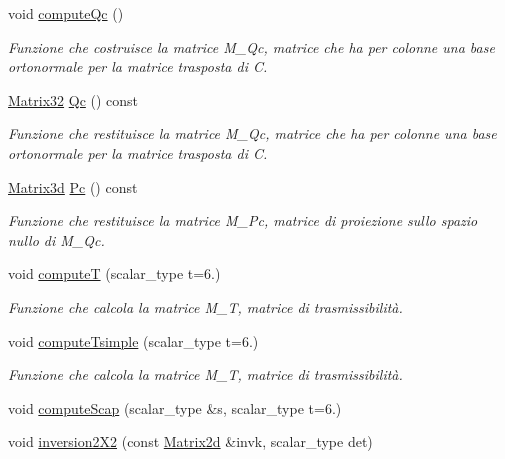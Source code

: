 \begin{DoxyCompactItemize}
void \hyperlink{classMatrixBifurcationHandler_a203b6bfcdef418ffa927aebaeedc6da2}{compute\-Qc} ()
\begin{DoxyCompactList}\small\item\em Funzione che costruisce la matrice M\-\_\-\-Qc, matrice che ha per colonne una base ortonormale per la matrice trasposta di C. \end{DoxyCompactList}\item 
\hyperlink{Core_8h_aee82131e398edee47a44d675ee802368}{Matrix32} \hyperlink{classMatrixBifurcationHandler_add50b813d3bd773ddf794c4e05b37e38}{Qc} () const 
\begin{DoxyCompactList}\small\item\em Funzione che restituisce la matrice M\-\_\-\-Qc, matrice che ha per colonne una base ortonormale per la matrice trasposta di C. \end{DoxyCompactList}\item 
\hyperlink{Core_8h_acd816705c6602062b91975525c4e3f6f}{Matrix3d} \hyperlink{classMatrixBifurcationHandler_ad84675e9be6d56de69c0e25bf1cd77cd}{Pc} () const 
\begin{DoxyCompactList}\small\item\em Funzione che restituisce la matrice M\-\_\-\-Pc, matrice di proiezione sullo spazio nullo di M\-\_\-\-Qc. \end{DoxyCompactList}\item 
void \hyperlink{classMatrixBifurcationHandler_a46ee3c60eedda32abe36700ab2ce2d16}{compute\-T} (scalar\-\_\-type t=6.)
\begin{DoxyCompactList}\small\item\em Funzione che calcola la matrice M\-\_\-\-T, matrice di trasmissibilità. \end{DoxyCompactList}\item 
void \hyperlink{classMatrixBifurcationHandler_a2153adb36bdbba82ca18ae74eb9e2ea7}{compute\-Tsimple} (scalar\-\_\-type t=6.)
\begin{DoxyCompactList}\small\item\em Funzione che calcola la matrice M\-\_\-\-T, matrice di trasmissibilità. \end{DoxyCompactList}\item 
void \hyperlink{classMatrixBifurcationHandler_aed78abe5cb83c5e6b0b2f9f1538f51ac}{compute\-Scap} (scalar\-\_\-type \&s, scalar\-\_\-type t=6.)
\item 
void \hyperlink{classMatrixBifurcationHandler_acafb7a17c3d639068938a21dad6bb0ec}{inversion2\-X2} (const \hyperlink{Core_8h_a1694976dd66ed00e5f0618f4f8821163}{Matrix2d} \&invk, scalar\-\_\-type det)

\end{DoxyCompactItemize}

